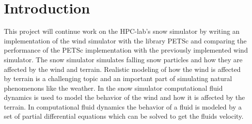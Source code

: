 \chapter{Introduction}

This project will continue work on the HPC-lab's snow simulator by writing an
implementation of the wind simulator with the library PETSc and comparing the
performance of the PETSc implementation with the previously implemented wind
simulator. The snow simulator simulates falling snow particles and how they are
affected by the wind and terrain. Realistic modeling of how the wind is affected
by terrain is a challenging topic and an important part of simulating natural
phenomenons like the weather. In the snow simulator computational fluid dynamics
is used to model the behavior of the wind and how it is affected by the terrain.
In computational fluid dynamics the behavior of a fluid is modeled by a set of
partial differential equations which can be solved to get the fluids velocity.





